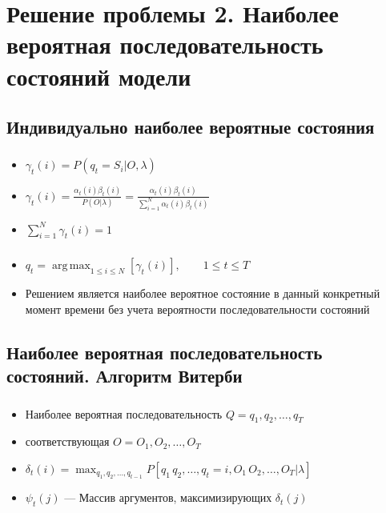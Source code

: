 \documentclass{beamer}
\DeclareMathOperator*{\argmax}{arg\,max}
\begin{document}
\section{Решение проблемы 2. Наиболее вероятная последовательность состояний модели}
\subsection{Индивидуально наиболее вероятные состояния}

\begin{frame}
  \frametitle{\insertsection}
  \framesubtitle{\insertsubsection}

  \begin{itemize}
  \item $\displaystyle \gamma_t(i) = P(q_t = S_i | O, \lambda)$ \pause
  \item $\displaystyle \gamma_t(i) = \frac{\alpha_t(i) \beta_t(i)}{P(O | \lambda)} = \frac{\alpha_t(i) \beta_t(i)}{\sum_{i = 1}^{N} \alpha_t(i) \beta_t(i)}$
    \pause
  \item $\displaystyle \sum_{i = 1}^N \gamma_t(i) = 1$
  \end{itemize}

\end{frame}

\begin{frame}
  \frametitle{\insertsection}
  \framesubtitle{\insertsubsection}

  \begin{itemize}
  \item $\displaystyle q_t = \argmax_{1 \le i \le N}{[\gamma_t(i)]}, \qquad 1 \le t \le T$
    \item Решением является наиболее вероятное состояние в \alert{данный конкретный момент времени} без учета вероятности \alert{последовательности состояний}
  \end{itemize}

\end{frame}

\subsection{Наиболее вероятная последовательность состояний. Алгоритм Витерби}

\begin{frame}
  \frametitle{\insertsection}
  \framesubtitle{\insertsubsection}

  \begin{itemize}
  \item Наиболее вероятная последовательность $\displaystyle Q = q_1, q_2, \ldots, q_T$ \pause
  \item соответствующая $O = O_1, O_2, \ldots, O_T$
  \item $\displaystyle \delta_t(i) = \max_{q_1, q_2, \ldots, q_{t - 1}}{P[q_1\, q_2, \ldots, q_t = i, O_1\, O_2, \ldots, O_T|\lambda]}$
  \item $\psi_t(j)$ --- Массив аргументов, максимизирующих $\delta_t(j)$
  \end{itemize}

\end{frame}
\end{document}
